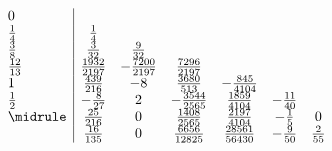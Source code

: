   \begin{equation*}
    \begin{array}{l | c c c c c c}
      0      &           &            &             &             &        &\\
      \frac{1}{4}    & \frac{1}{4}       &            &             &             &        &\\
      \frac{3}{8}    & \frac{3}{32}      & \frac{9}{32}       &             &             &        &\\
      \frac{12}{13}  & \frac{1932}{2197} & -\frac{7200}{2197} & \frac{7296}{2197}   &             &        &\\
      1      & \frac{439}{216}   & -8         & \frac{3680}{513}    & -\frac{845}{4104}   &        &\\
      \frac{1}{2}    & -\frac{8}{27}     & 2          & -\frac{3544}{2565}  & \frac{1859}{4104}   & -\frac{11}{40} &\\\midrule
      & \frac{25}{216}    & 0          & \frac{1408}{2565}   & \frac{2197}{4104}   & -\frac{1}{5}   & 0      \\
      & \frac{16}{135}    & 0          & \frac{6656}{12825}  & \frac{28561}{56430} & -\frac{9}{50}  & \frac{2}{55}
    \end{array}
  \end{equation*}
